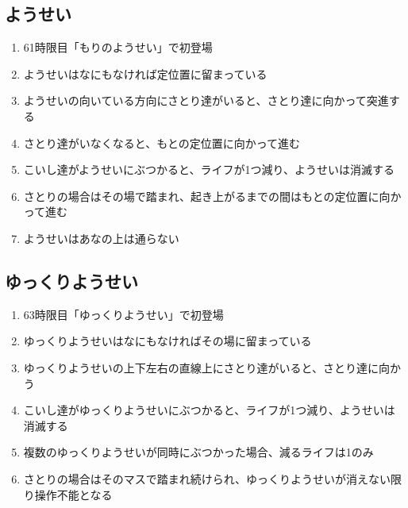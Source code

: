 \subsection{ようせい}
\begin{enumerate}[label={\sarrow}]
\item 61時限目「もりのようせい」で初登場
\item ようせいはなにもなければ定位置に留まっている
\item ようせいの向いている方向にさとり達がいると、さとり達に向かって突進する
\item さとり達がいなくなると、もとの定位置に向かって進む
\item こいし達がようせいにぶつかると、ライフが1つ減り、ようせいは消滅する
\item さとりの場合はその場で踏まれ、起き上がるまでの間はもとの定位置に向かって進む
\item ようせいはあなの上は通らない
\end{enumerate}


\subsection{ゆっくりようせい}
\begin{enumerate}[label={\sarrow}]
\item 63時限目「ゆっくりようせい」で初登場
\item ゆっくりようせいはなにもなければその場に留まっている
\item ゆっくりようせいの上下左右の直線上にさとり達がいると、さとり達に向かう
\item こいし達がゆっくりようせいにぶつかると、ライフが1つ減り、ようせいは消滅する
\item 複数のゆっくりようせいが同時にぶつかった場合、減るライフは1のみ
\item さとりの場合はそのマスで踏まれ続けられ、ゆっくりようせいが消えない限り操作不能となる
\end{enumerate}


\clearpage
